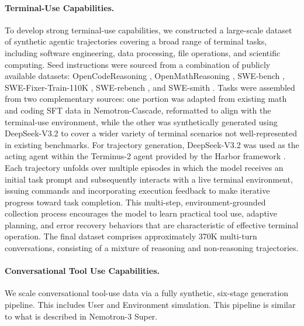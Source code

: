 \paragraph{Terminal-Use Capabilities.}
To develop strong terminal-use capabilities, we constructed a large-scale dataset of synthetic agentic trajectories covering a broad range of terminal tasks, including software engineering, data processing, file operations, and scientific computing. Seed instructions were sourced from a combination of publicly available datasets: OpenCodeReasoning \citep{nvidia2025opencodeReasoning}, OpenMathReasoning \citep{nvidia2025openmathReasoning}, SWE-bench \citep{jimenez2024swebenchlanguagemodelsresolve}, SWE-Fixer-Train-110K \citep{swefixer2025}, SWE-rebench \citep{badertdinov2025swerebenchautomatedpipelinetask}, and SWE-smith \citep{pan2025swesmith}. Tasks were assembled from two complementary sources: one portion was adapted from existing math and coding SFT data in Nemotron-Cascade, reformatted to align with the terminal-use environment, while the other was synthetically generated using DeepSeek-V3.2 \citep{deepseekai2025deepseekv3technicalreport} to cover a wider variety of terminal scenarios not well-represented in existing benchmarks. For trajectory generation, DeepSeek-V3.2 was used as the acting agent within the Terminus-2 agent provided by the Harbor framework \citep{harbor2025}. Each trajectory unfolds over multiple episodes in which the model receives an initial task prompt and subsequently interacts with a live terminal environment, issuing commands and incorporating execution feedback to make iterative progress toward task completion. This multi-step, environment-grounded collection process encourages the model to learn practical tool use, adaptive planning, and error recovery behaviors that are characteristic of effective terminal operation. The final dataset comprises approximately 370K multi-turn conversations, consisting of a mixture of reasoning and non-reasoning trajectories.

\paragraph{Conversational Tool Use Capabilities.}
We scale conversational tool-use data via a fully
synthetic, six-stage generation pipeline. This includes User and Environment simulation. This pipeline is similar to what is described in Nemotron-3 Super. 

